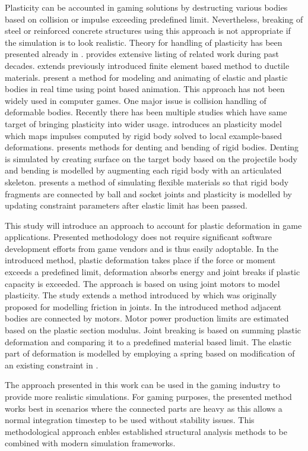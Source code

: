 Plasticity can be  accounted in gaming solutions by destructing various bodies based on collision
or impulse exceeding predefined limit.
Nevertheless, breaking of steel or reinforced concrete structures using this approach 
is not appropriate if the simulation is to look realistic. Theory for handling of plasticity 
has been presented already in \cite{cg1988}. 
\cite{Jones:2016:EPD} provides extensive listing of related work during past decades.
\cite{Obrien:2002:GMA} extends previously introduced finite element based method \cite{Obrien:1999:GMA}
to ductile materials.
\cite{muller2005meshless} 
present a method for modeling and animating of elastic and plastic bodies in real time using 
point based animation. This approach has not been widely used in computer games.  
One major issue is collision handling of deformable bodies.
Recently there has been multiple studies which have same target of bringing plasticity 
into wider usage.
\cite{Jones:2016:EPD} introduces an plasticity model which
maps impulses computed by rigid body solved to local example-based deformations.
\cite{Patkar:2015:EDB} presents methods for denting and bending of rigid bodies.
Denting is simulated by creating surface on the target body based on the projectile body
and bending is modelled by augmenting each rigid body with an articulated skeleton.
\cite{Budsberg:2014:EPD} presents a method of simulating flexible materials so
that rigid body fragments are connected by ball and socket joints and plasticity is
modelled by updating constraint parameters after elastic limit has been passed.

This study will introduce an approach to account for plastic deformation in game applications.   
Presented methodology does not require significant software development efforts from
game vendors and is thus easily adoptable. 
In the introduced method, plastic deformation takes place if the force or moment exceeds a predefined 
limit, deformation absorbs energy and joint breaks if plastic capacity is exceeded. 
The approach is based on using joint motors to model plasticity. 
The study extends a method introduced by
\cite{erleben.thesis} 
which was originally proposed for modelling friction in joints. 
In the introduced method adjacent bodies are connected by motors. 
Motor power production limits are estimated based on the plastic section modulus. 
Joint breaking is based on summing plastic deformation and comparing it to a
predefined material based limit. The elastic part of deformation is modelled by employing 
a spring based on modification of an existing constraint in \cbullet.

The approach presented in this work can be used in the gaming industry to provide more realistic 
simulations. For gaming purposes, the presented method works 
best in scenarios where the connected parts are heavy as this allows a normal 
integration timestep to be used without stability issues. 
This methodological approach enbles established structural analysis
methods to be combined with modern simulation frameworks.

